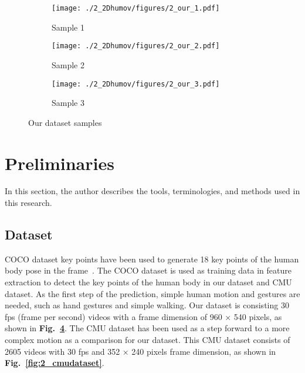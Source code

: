 \begin{figure}
    \centering
    \begin{subfigure}[t]{0.45\textwidth}
        \centering
        \texttt{[image: ./2\_2Dhumov/figures/2\_our\_1.pdf]}
        \caption{Sample 1}
        \label{fig:2_ourdataset_1}
    \end{subfigure}
    \begin{subfigure}[t]{0.45\textwidth}
        \centering
        \texttt{[image: ./2\_2Dhumov/figures/2\_our\_2.pdf]}
        \caption{Sample 2}
        \label{fig:2_ourdataset_2}
    \end{subfigure}
    \begin{subfigure}[t]{0.5\textwidth}
        \centering
        \texttt{[image: ./2\_2Dhumov/figures/2\_our\_3.pdf]}
        \caption{Sample 3}
        \label{fig:2_ourdataset_3}
    \end{subfigure}
    \caption{Our dataset samples}
    \label{fig:2_ourdataset}
\end{figure}


\section{Preliminaries}\label{2:prelim}
In this section, the author describes the tools, terminologies, and methods used in this research.

\subsection{Dataset}\label{2:prelim_dataset}
COCO dataset key points have been used to generate 18 key points of the human body pose in the frame~\cite{Cao2017, kruusamaehuman}. The COCO dataset is used as training data in feature extraction to detect the key points of the human body in our dataset and CMU dataset. As the first step of the prediction, simple human motion and gestures are needed, such as hand gestures and simple walking. Our dataset is consisting 30 fps (frame per second) videos with a frame dimension of 960 × 540 pixels, as shown in \textbf{Fig.~\ref{fig:2_ourdataset}}. The CMU dataset has been used as a step forward to a more complex motion as a comparison for our dataset. This CMU dataset consists of 2605 videos with 30 fps and 352 × 240 pixels frame dimension, as shown in \textbf{Fig.~\ref{fig:2_cmudataset}}.

